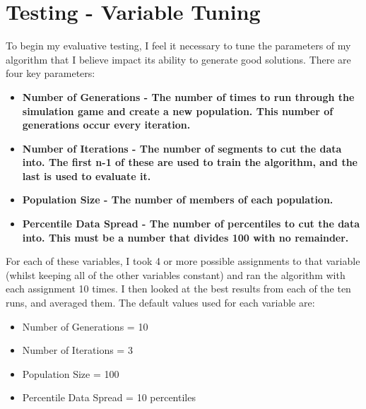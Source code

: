 \section{Testing - Variable Tuning} \label{actualTesting}
To begin my evaluative testing, I feel it necessary to tune the parameters of my algorithm that I believe impact its ability to generate good solutions. There are four key parameters:

\begin{itemize}
    \item \bf Number of Generations \rm - The number of times to run through the simulation game and create a new population. This number of generations occur every iteration.
    \item \bf Number of Iterations \rm - The number of segments to cut the data into. The first n-1 of these are used to train the algorithm, and the last is used to evaluate it.
    \item \bf Population Size \rm - The number of members of each population.
    \item \bf Percentile Data Spread \rm - The number of percentiles to cut the data into. This must be a number that divides 100 with no remainder.
\end{itemize}

For each of these variables, I took 4 or more possible assignments to that variable (whilst keeping all of the other variables constant) and ran the algorithm with each assignment 10 times. I then looked at the best results from each of the ten runs, and averaged them. The default values used for each variable are:
\begin{itemize}
    \item Number of Generations = 10
    \item Number of Iterations = 3
    \item Population Size = 100
    \item Percentile Data Spread = 10 percentiles
\end{itemize}

